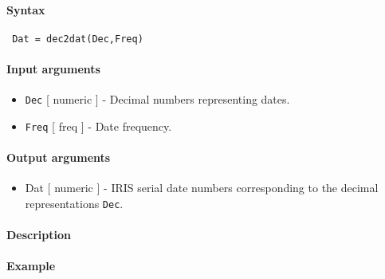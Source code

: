 


	\paragraph{Syntax}
 
 \begin{verbatim}
 Dat = dec2dat(Dec,Freq)
 \end{verbatim}
 
 \paragraph{Input arguments}
 
 \begin{itemize}
 \item
   \texttt{Dec} {[} numeric {]} - Decimal numbers representing dates.
 \item
   \texttt{Freq} {[} freq {]} - Date frequency.
 \end{itemize}
 
 \paragraph{Output arguments}
 
 \begin{itemize}
 \item
   Dat {[} numeric {]} - IRIS serial date numbers corresponding to the
   decimal representations \texttt{Dec}.
 \end{itemize}
 
 \paragraph{Description}
 
 \paragraph{Example}


